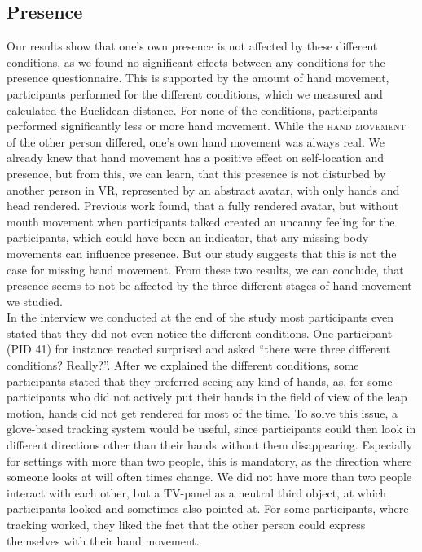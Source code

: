 \documentclass[english,runningheads,a4paper]{llncs}[2018/03/10]
\begin{document}
\subsection{Presence}
Our results show that one's own presence is not affected by these different conditions, as we found no significant effects between any conditions for the presence questionnaire. 
This is supported by the amount of hand movement, participants performed for the different conditions, which we measured and calculated the Euclidean distance.
For none of the conditions, participants performed significantly less or more hand movement. 
While the \textsc{hand movement} of the other person differed, one's own hand movement was always real.
We already knew that hand movement has a positive effect on self-location and presence, but from this, we can learn, that this presence is not disturbed by another person in VR, represented by an abstract avatar, with only hands and head rendered. 
Previous work found, that a fully rendered avatar, but without mouth movement when participants talked created an uncanny feeling for the participants, which could have been an indicator, that any missing body movements can influence presence.  
But our study suggests that this is not the case for missing hand movement. 
From these two results, we can conclude, that presence seems to not be affected by the three different stages of hand movement we studied. \\ \linebreak
In the interview we conducted at the end of the study most participants even stated that they did not even notice the different conditions. 
One participant (PID 41) for instance reacted surprised and asked ``there were three different conditions? Really?''. 
After we explained the different conditions, some participants stated that they preferred seeing any kind of hands, as, for some participants who did not actively put their hands in the field of view of the leap motion, hands did not get rendered for most of the time. 
To solve this issue, a glove-based tracking system would be useful, since participants could then look in different directions other than their hands without them disappearing. 
Especially for settings with more than two people, this is mandatory, as the direction where someone looks at will often times change. 
We did not have more than two people interact with each other, but a TV-panel as a neutral third object, at which participants looked and sometimes also pointed at.
For some participants, where tracking worked, they liked the fact that the other person could express themselves with their hand movement. 
\end{document}
